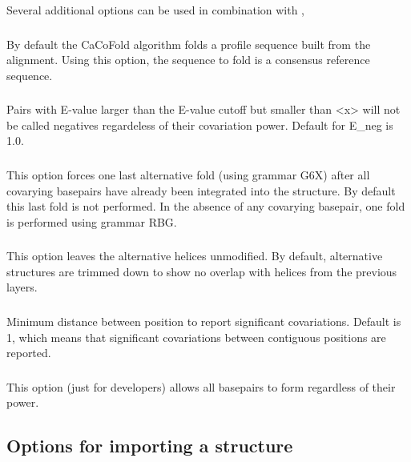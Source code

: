 \noindent
Several additional options can be used in combination with   ,

\subsubsection{}   By default the CaCoFold algorithm folds a profile sequence built from the alignment. Using this option, the sequence to fold is a consensus reference sequence.

\subsubsection{}   Pairs with E-value larger than the E-value cutoff but smaller than <x> will not be called negatives regardeless of their covariation power. Default for E\_neg is 1.0.

\subsubsection{} This option forces one last alternative fold (using grammar G6X) after all covarying basepairs have already been
integrated into the structure. By default this last fold is not
performed. In the absence of any covarying basepair, one fold is
performed using grammar RBG.

\subsubsection{} This option leaves the alternative helices unmodified. By default, alternative structures are trimmed down to show no overlap with helices from the previous layers.

\subsubsection{} Minimum distance between position to report significant covariations. Default is 1, which means that significant covariations between
contiguous positions are reported.

\subsubsection{} This option (just for developers) allows all basepairs to form regardless of their power.

\subsection{Options for importing a structure}

